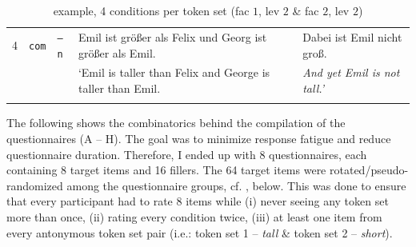 \documentclass[output=paper,
modfonts
]{langscibook}
\begin{document}
\begin{table}
\begin{tabular}{lllll}
\midrule
4 & \texttt{com} & \texttt{\footnotesize{--}n} & Emil ist größer als Felix \hspace{0.65pt} und Georg ist \hspace{16pt} größer als Emil. & Dabei ist Emil nicht groß.   \\
 & & & {`Emil is taller than Felix \hspace{2pt} and George is \hspace{19pt} taller than Emil.} & \textit{And yet Emil is not tall.'}   \\
\lspbottomrule
\end{tabular}
\caption{example, 4 conditions  per token set (fac $1$, lev $2$ \& fac $2$, lev $2$)}
\label{tab:emil_example}
\end{table}


\noindent The following shows the combinatorics behind the compilation of the questionnaires (A -- H). The goal was to minimize response fatigue and reduce questionnaire duration. Therefore, I ended up with 8 questionnaires, each containing 8 target items and 16 fillers. The 64 target items were rotated/pseudo-randomized among the questionnaire groups, cf. , below. This was done to ensure that every participant had to rate 8 items while (i) never seeing any token set more than once, (ii) rating every condition twice, (iii) at least one item from every antonymous token set pair (i.e.: token set 1 -- \textit{tall} \& token set 2 -- \textit{short}).
\end{document}
